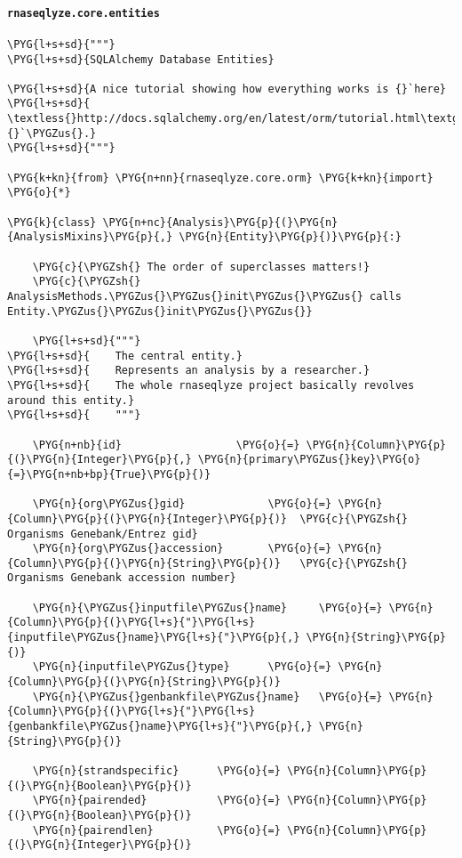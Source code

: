 \paragraph{\texttt{rnaseqlyze.core.entities}}
\label{index-pdf4:rnaseqlyze-core-entities}
\begin{Verbatim}[commandchars=\\\{\}]
\PYG{l+s+sd}{"""}
\PYG{l+s+sd}{SQLAlchemy Database Entities}

\PYG{l+s+sd}{A nice tutorial showing how everything works is {}`here}
\PYG{l+s+sd}{    \textless{}http://docs.sqlalchemy.org/en/latest/orm/tutorial.html\textgreater{}{}`\PYGZus{}.}
\PYG{l+s+sd}{"""}

\PYG{k+kn}{from} \PYG{n+nn}{rnaseqlyze.core.orm} \PYG{k+kn}{import} \PYG{o}{*}

\PYG{k}{class} \PYG{n+nc}{Analysis}\PYG{p}{(}\PYG{n}{AnalysisMixins}\PYG{p}{,} \PYG{n}{Entity}\PYG{p}{)}\PYG{p}{:}

    \PYG{c}{\PYGZsh{} The order of superclasses matters!}
    \PYG{c}{\PYGZsh{} AnalysisMethods.\PYGZus{}\PYGZus{}init\PYGZus{}\PYGZus{} calls Entity.\PYGZus{}\PYGZus{}init\PYGZus{}\PYGZus{}}

    \PYG{l+s+sd}{"""}
\PYG{l+s+sd}{    The central entity.}
\PYG{l+s+sd}{    Represents an analysis by a researcher.}
\PYG{l+s+sd}{    The whole rnaseqlyze project basically revolves around this entity.}
\PYG{l+s+sd}{    """}

    \PYG{n+nb}{id}                  \PYG{o}{=} \PYG{n}{Column}\PYG{p}{(}\PYG{n}{Integer}\PYG{p}{,} \PYG{n}{primary\PYGZus{}key}\PYG{o}{=}\PYG{n+nb+bp}{True}\PYG{p}{)}

    \PYG{n}{org\PYGZus{}gid}             \PYG{o}{=} \PYG{n}{Column}\PYG{p}{(}\PYG{n}{Integer}\PYG{p}{)}  \PYG{c}{\PYGZsh{} Organisms Genebank/Entrez gid}
    \PYG{n}{org\PYGZus{}accession}       \PYG{o}{=} \PYG{n}{Column}\PYG{p}{(}\PYG{n}{String}\PYG{p}{)}   \PYG{c}{\PYGZsh{} Organisms Genebank accession number}

    \PYG{n}{\PYGZus{}inputfile\PYGZus{}name}     \PYG{o}{=} \PYG{n}{Column}\PYG{p}{(}\PYG{l+s}{"}\PYG{l+s}{inputfile\PYGZus{}name}\PYG{l+s}{"}\PYG{p}{,} \PYG{n}{String}\PYG{p}{)}
    \PYG{n}{inputfile\PYGZus{}type}      \PYG{o}{=} \PYG{n}{Column}\PYG{p}{(}\PYG{n}{String}\PYG{p}{)}
    \PYG{n}{\PYGZus{}genbankfile\PYGZus{}name}   \PYG{o}{=} \PYG{n}{Column}\PYG{p}{(}\PYG{l+s}{"}\PYG{l+s}{genbankfile\PYGZus{}name}\PYG{l+s}{"}\PYG{p}{,} \PYG{n}{String}\PYG{p}{)}

    \PYG{n}{strandspecific}      \PYG{o}{=} \PYG{n}{Column}\PYG{p}{(}\PYG{n}{Boolean}\PYG{p}{)}
    \PYG{n}{pairended}           \PYG{o}{=} \PYG{n}{Column}\PYG{p}{(}\PYG{n}{Boolean}\PYG{p}{)}
    \PYG{n}{pairendlen}          \PYG{o}{=} \PYG{n}{Column}\PYG{p}{(}\PYG{n}{Integer}\PYG{p}{)}


\end{Verbatim}
